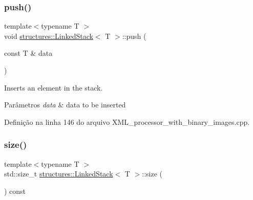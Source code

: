 \subsubsection{\texorpdfstring{push()}{push()}}
{\footnotesize\ttfamily template$<$typename T $>$ \\
void \mbox{\hyperlink{classstructures_1_1LinkedStack}{structures\+::\+Linked\+Stack}}$<$ T $>$\+::push (\begin{DoxyParamCaption}\item[{const T \&}]{data }\end{DoxyParamCaption})}



Inserts an element in the stack. 


\begin{DoxyParams}{Parâmetros}
{\em data} & data to be inserted \\
\hline
\end{DoxyParams}


Definição na linha 146 do arquivo X\+M\+L\+\_\+processor\+\_\+with\+\_\+binary\+\_\+images.\+cpp.


\begin{DoxyCode}{0}

\end{DoxyCode}
\mbox{\label{classstructures_1_1LinkedStack_ae1ca6a5a9b837471863f1c8bb23cfe1d}} 
\subsubsection{\texorpdfstring{size()}{size()}}
{\footnotesize\ttfamily template$<$typename T $>$ \\
std\+::size\+\_\+t \mbox{\hyperlink{classstructures_1_1LinkedStack}{structures\+::\+Linked\+Stack}}$<$ T $>$\+::size (\begin{DoxyParamCaption}{ }\end{DoxyParamCaption}) const}



